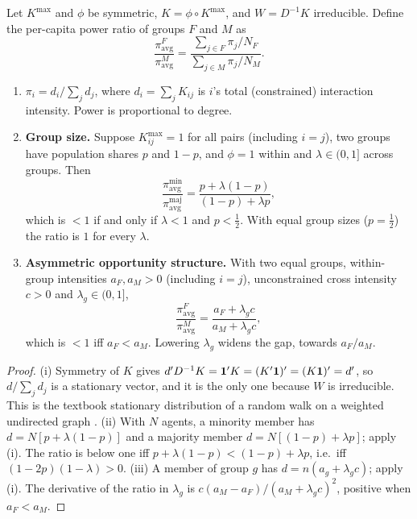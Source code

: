 \documentclass[../structural_economics_book.tex]{subfiles}
\begin{document}
\begin{proposition}\label{ch18:prop:homophily_power}
Let $K^{\max}$ and $\phi$ be symmetric, $K = \phi \circ K^{\max}$, and $W = D^{-1}K$ irreducible. Define the per-capita power ratio of groups $F$ and $M$ as
\begin{equation}\label{ch18:eq:gender_pi}
\frac{\pi^F_{\text{avg}}}{\pi^M_{\text{avg}}} = \frac{\sum_{j \in F} \pi_j / N_F}{\sum_{j \in M} \pi_j / N_M}.
\end{equation}
\begin{enumerate}
\item[(i)] $\pi_i = d_i/\sum_j d_j$, where $d_i = \sum_j K_{ij}$ is $i$'s total (constrained) interaction intensity. Power is proportional to degree.
\item[(ii)] \textbf{Group size.} Suppose $K^{\max}_{ij} = 1$ for all pairs (including $i = j$), two groups have population shares $p$ and $1-p$, and $\phi = 1$ within and $\lambda \in (0,1]$ across groups. Then
\begin{equation}\label{ch18:eq:minority_ratio}
\frac{\pi^{\text{min}}_{\text{avg}}}{\pi^{\text{maj}}_{\text{avg}}} = \frac{p + \lambda(1-p)}{(1-p) + \lambda p},
\end{equation}
which is $<1$ if and only if $\lambda < 1$ and $p < \tfrac12$. With equal group sizes ($p = \tfrac12$) the ratio is $1$ for every $\lambda$.
\item[(iii)] \textbf{Asymmetric opportunity structure.} With two equal groups, within-group intensities $a_F, a_M > 0$ (including $i = j$), unconstrained cross intensity $c > 0$ and $\lambda_g \in (0,1]$,
\[
\frac{\pi^F_{\text{avg}}}{\pi^M_{\text{avg}}} = \frac{a_F + \lambda_g c}{a_M + \lambda_g c},
\]
which is $<1$ iff $a_F < a_M$. Lowering $\lambda_g$ widens the gap, towards $a_F/a_M$.
\end{enumerate}
\end{proposition}

\begin{proof}
(i) Symmetry of $K$ gives $d'D^{-1}K = \mathbf{1}'K = (K'\mathbf{1})' = (K\mathbf{1})' = d'$, so $d/\sum_j d_j$ is a stationary vector, and it is the only one because $W$ is irreducible. This is the textbook stationary distribution of a random walk on a weighted undirected graph \citep[\S 9.1]{levin2009markov}. (ii) With $N$ agents, a minority member has $d = N[p + \lambda(1-p)]$ and a majority member $d = N[(1-p) + \lambda p]$; apply (i). The ratio is below one iff $p + \lambda(1-p) < (1-p) + \lambda p$, i.e.\ iff $(1-2p)(1-\lambda) > 0$. (iii) A member of group $g$ has $d = n(a_g + \lambda_g c)$; apply (i). The derivative of the ratio in $\lambda_g$ is $c(a_M - a_F)/(a_M + \lambda_g c)^2$, positive when $a_F < a_M$.
\end{proof}
\end{document}
